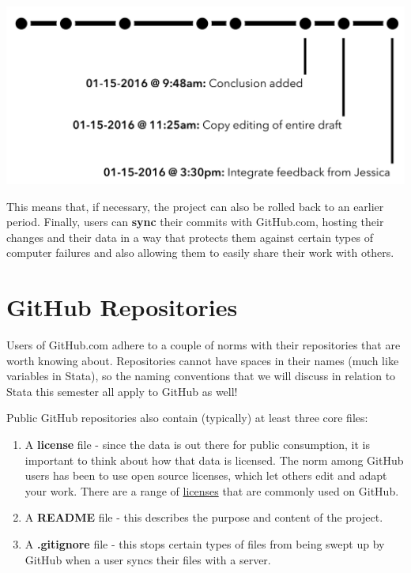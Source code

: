 \documentclass[]{book}
\begin{document}
\includegraphics[width=1\linewidth]{images/gitFlow04}

This means that, if necessary, the project can also be rolled back to an
earlier period. Finally, users can \textbf{sync} their commits with
GitHub.com, hosting their changes and their data in a way that protects
them against certain types of computer failures and also allowing them
to easily share their work with others.

\section{GitHub Repositories}\label{github-repositories}

Users of GitHub.com adhere to a couple of norms with their repositories
that are worth knowing about. Repositories cannot have spaces in their
names (much like variables in Stata), so the naming conventions that we
will discuss in relation to Stata this semester all apply to GitHub as
well!

Public GitHub repositories also contain (typically) at least three core
files:

\begin{enumerate}
\def\labelenumi{\arabic{enumi}.}
\item
  A \textbf{license} file - since the data is out there for public
  consumption, it is important to think about how that data is licensed.
  The norm among GitHub users has been to use open source licenses,
  which let others edit and adapt your work. There are a range of
  \href{http://choosealicense.com}{licenses} that are commonly used on
  GitHub.
\item
  A \textbf{README} file - this describes the purpose and content of the
  project.
\item
  A \textbf{.gitignore} file - this stops certain types of files from
  being swept up by GitHub when a user syncs their files with a server.
\end{enumerate}
\end{document}
